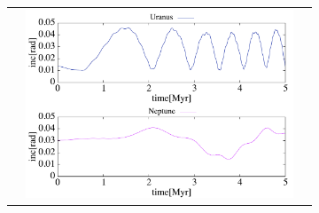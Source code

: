 \documentclass[11pt,a4paper,oneside,onecolumn]{jarticle}
\begin{document}
\begin{figure}[H]
\begin{tabular}{ccc}
\begin{minipage}[t]{0.1\hsize}
\end{minipage} &
\begin{minipage}[t]{0.45\hsize}
\centering
\includegraphics[width=8cm]{./image/Move500kyr_inc_5Myr_URANEP.pdf}
\end{minipage}
%
\end{tabular}
\caption{\label{}}
\end{figure}
\end{document}

